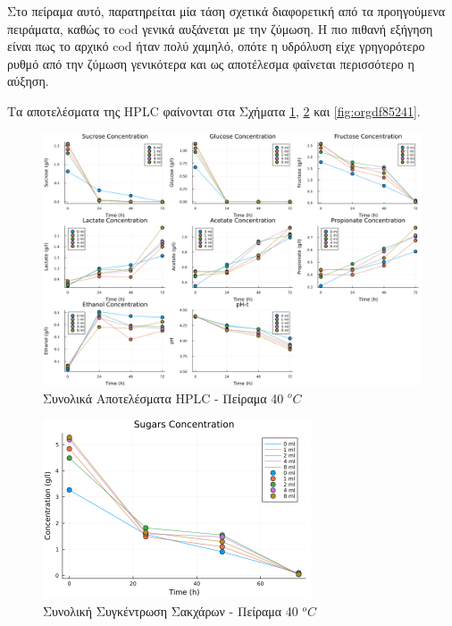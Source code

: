 \documentclass[11pt]{report}
\begin{document}
\begin{enumerate}
Στο πείραμα αυτό, παρατηρείται μία τάση σχετικά διαφορετική από τα προηγούμενα πειράματα, καθώς το \acrshort{cod} γενικά αυξάνεται με την ζύμωση. Η πιο πιθανή εξήγηση είναι πως το αρχικό \acrshort{cod} ήταν πολύ χαμηλό, οπότε η υδρόλυση είχε γρηγορότερο ρυθμό από την ζύμωση γενικότερα και ως αποτέλεσμα φαίνεται περισσότερο η αύξηση.

Τα αποτελέσματα της HPLC φαίνονται στα Σχήματα \ref{fig:org272f1a5}, \ref{fig:orge86e617} και \ref{fig:orgdf85241}.

\begin{figure}[htbp]
\centering
\includegraphics[width=.9\linewidth]{../plots/28_11/final_scatter_28_11.png}
\caption{\label{fig:org272f1a5}Συνολικά Αποτελέσματα HPLC - Πείραμα 40 \(^oC\)}
\end{figure}

\begin{figure}[htbp]
\centering
\includegraphics[width=300px]{../plots/28_11/sugars_conc_scatter_28_11.png}
\caption{\label{fig:orge86e617}Συνολική Συγκέντρωση Σακχάρων - Πείραμα 40 \(^oC\)}
\end{figure}


\end{enumerate}
\end{document}
